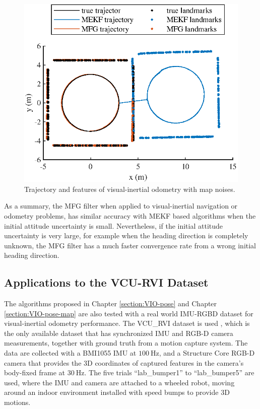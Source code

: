 \begin{figure}
	\centering
	\includegraphics[scale=1.1]{figures/VIO-map-filter-trajectory2}
	\caption{Trajectory and features of visual-inertial odometry with map noises.}
	\label{fig:VIO-map-filter-trajectory2}
\end{figure}

As a summary, the MFG filter when applied to visual-inertial navigation or odometry problems, has similar accuracy with MEKF based algorithms when the initial attitude uncertainty is small.
Nevertheless, if the initial attitude uncertainty is very large, for example when the heading direction is completely unknown, the MFG filter has a much faster convergence rate from a wrong initial heading direction.

\subsection{Applications to the VCU-RVI Dataset}

The algorithms proposed in Chapter \ref{section:VIO-pose} and Chapter \ref{section:VIO-pose-map} are also tested with a real world IMU-RGBD dataset for visual-inertial odometry performance.
The VCU\_RVI dataset is used \cite{zhang2020vcu}, which is the only available dataset that has synchronized IMU and RGB-D camera measurements, together with ground truth from a motion capture system.
The data are collected with a BMI1055 IMU at $\SI{100}{\hertz}$, and a Structure Core RGB-D camera that provides the 3D coordinates of captured features in the camera's body-fixed frame at $\SI{30}{\hertz}$.
The five trials ``lab\_bumper1'' to ``lab\_bumper5'' are used, where the IMU and camera are attached to a wheeled robot, moving around an indoor environment installed with speed bumps to provide 3D motions.


